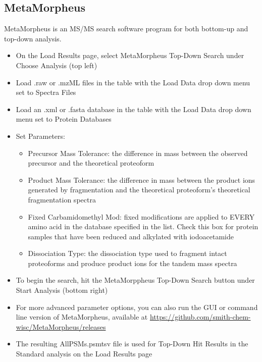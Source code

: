 \subsection{MetaMorpheus}
MetaMorpheus is an MS/MS search software program for both bottom-up and top-down analysis.\supercite{Solntsev2018,Schaffer2019}
\begin{itemize}
\item On the Load Results page, select MetaMorpheus Top-Down Search under Choose Analysis (top left)
\item Load .raw or .mzML files in the table with the Load Data drop down menu set to Spectra Files
\item Load an .xml or .fasta database in the table with the Load Data drop down menu set to Protein Databases
\item Set Parameters:
\begin{itemize}
\item Precursor Mass Tolerance: the difference in mass between the observed precursor and the theoretical proteoform
\item Product Mass Tolerance: the difference in mass between the product ions generated by fragmentation and the theoretical proteoform's theoretical fragmentation spectra
\item Fixed Carbamidomethyl Mod:  fixed modifications are applied to EVERY amino acid in the database specified in the list. Check this box for protein samples that have been reduced and alkylated with iodoacetamide
\item Dissociation Type: the dissociation type used to fragment intact proteoforms and produce product ions for the tandem mass spectra
\end{itemize}
\item To begin the search, hit the MetaMorppheus Top-Down Search button under Start Analysis (bottom right)
\item For more advanced parameter options, you can also run the GUI or command line version of MetaMorpheus, available at \url{https://github.com/smith-chem-wisc/MetaMorpheus/releases}
\item The resulting AllPSMs.psmtsv file is used for Top-Down Hit Results in the Standard analysis on the Load Results page
\end{itemize}
